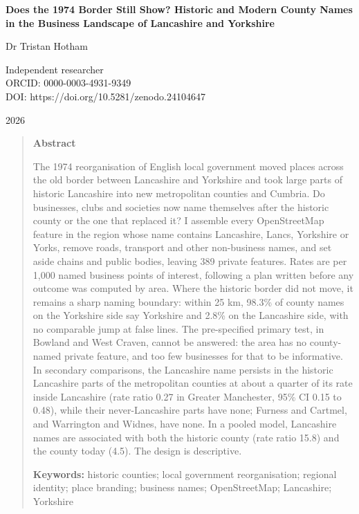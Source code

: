 \documentclass[11pt,a4paper]{article}
\begin{document}
\begin{center}
{\Large\bfseries Does the 1974 Border Still Show? Historic and Modern County Names in the Business Landscape of Lancashire and Yorkshire\par}
\vspace{1.2em}
{\large Dr Tristan Hotham\par}
\vspace{0.3em}
{\small Independent researcher\\
ORCID: 0000-0003-4931-9349\\
DOI: https://doi.org/10.5281/zenodo.24104647\par}
\vspace{0.8em}
2026
\end{center}

\begin{quote}
\small
\begin{center}\textbf{Abstract}\end{center}
The 1974 reorganisation of English local government moved places across the old border between Lancashire and Yorkshire and took large parts of historic Lancashire into new metropolitan counties and Cumbria. Do businesses, clubs and societies now name themselves after the historic county or the one that replaced it? I assemble every OpenStreetMap feature in the region whose name contains Lancashire, Lancs, Yorkshire or Yorks, remove roads, transport and other non-business names, and set aside chains and public bodies, leaving 389 private features. Rates are per 1,000 named business points of interest, following a plan written before any outcome was computed by area. Where the historic border did not move, it remains a sharp naming boundary: within 25 km, 98.3\% of county names on the Yorkshire side say Yorkshire and 2.8\% on the Lancashire side, with no comparable jump at false lines. The pre-specified primary test, in Bowland and West Craven, cannot be answered: the area has no county-named private feature, and too few businesses for that to be informative. In secondary comparisons, the Lancashire name persists in the historic Lancashire parts of the metropolitan counties at about a quarter of its rate inside Lancashire (rate ratio 0.27 in Greater Manchester, 95\% CI 0.15 to 0.48), while their never-Lancashire parts have none; Furness and Cartmel, and Warrington and Widnes, have none. In a pooled model, Lancashire names are associated with both the historic county (rate ratio 15.8) and the county today (4.5). The design is descriptive.

\textbf{Keywords:} historic counties; local government reorganisation; regional identity; place branding; business names; OpenStreetMap; Lancashire; Yorkshire
\end{quote}
\end{document}
